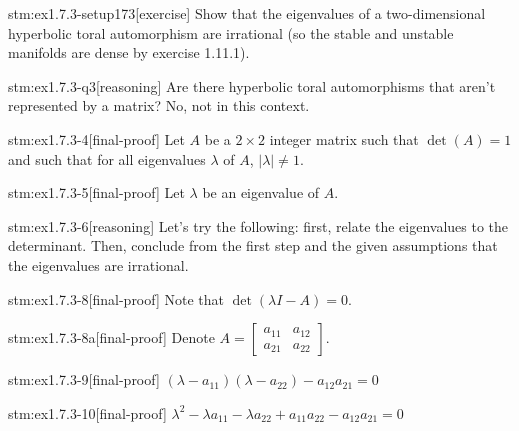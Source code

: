 
\begin{stm}{stm:ex1.7.3-setup173}[exercise]
Show that the eigenvalues of a two-dimensional hyperbolic toral automorphism are irrational (so the stable and unstable manifolds are dense by exercise 1.11.1).
\end{stm}


\begin{stm}{stm:ex1.7.3-q3}[reasoning]
Are there hyperbolic toral automorphisms that aren't represented by a matrix? No, not in this context.
\end{stm}

\begin{stm}{stm:ex1.7.3-4}[final-proof]
Let $A$ be a $2 \times 2$ integer matrix such that $\det(A) = 1$ and such that for all eigenvalues $\lambda$ of $A$, $|\lambda| \neq 1$.
\end{stm}

\begin{stm}{stm:ex1.7.3-5}[final-proof]
Let $\lambda$ be an eigenvalue of $A$.
\end{stm}

\begin{stm}{stm:ex1.7.3-6}[reasoning]
Let's try the following: first, relate the eigenvalues to the determinant. Then, conclude from the first step and the given assumptions that the eigenvalues are irrational.
\end{stm}

\begin{stm}{stm:ex1.7.3-8}[final-proof]
Note that $\det(\lambda I - A) = 0$.
\end{stm}

\begin{stm}{stm:ex1.7.3-8a}[final-proof]
Denote $A = \begin{bmatrix} a_{11} & a_{12} \\ a_{21} & a_{22} \end{bmatrix}$.
\end{stm}

\begin{stm}{stm:ex1.7.3-9}[final-proof]
$(\lambda - a_{11})(\lambda - a_{22}) - a_{12}a_{21} = 0$
\end{stm}

\begin{stm}{stm:ex1.7.3-10}[final-proof]
$\lambda^2 - \lambda a_{11} - \lambda a_{22} + a_{11}a_{22} - a_{12}a_{21} = 0$
\end{stm}

